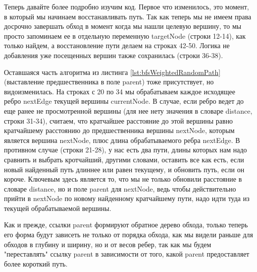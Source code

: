 \documentclass[../article.tex]{subfiles}
\begin{document}

Теперь давайте более подробно изучим код. Первое что изменилось, это момент, в который мы начинаем восстанавливать путь. Так как теперь мы не имеем права досрочно завершать обход в момент когда мы нашли целевую вершину, то мы просто запоминаем ее в отдельную переменную {\firacodebold targetNode} (строки 12-14), как только найдем, а восстановление пути делаем на строках 42-50. Логика не добавления уже посещенных вершин также сохранилась (строки 36-38).

Оставшаяся часть алгоритма из листинга \ref{lst:bfsWeightedRandomPath} (выставление предшественника в поле {\firacodebold parent}) тоже присутствует, но видоизменилась. На строках с 20 по 34 мы обрабатываем каждое исходящее ребро {\firacodebold nextEdge} текущей вершины {\firacodebold currentNode}. В случае, если ребро ведет до еще ранее не просмотренной вершины (для нее нету значения в словаре {\firacodebold distance}, строки 31-34), считаем, что кратчайшее расстояние до этой вершины равно кратчайшему расстоянию до предшественника вершины {\firacodebold nextNode}, которым является вершина {\firacodebold nextNode}, плюс длина обрабатываемого ребра {\firacodebold nextEdge}. В противном случае (строки 21-28), у нас есть два пути, длины которых нам надо сравнить и выбрать кротчайший, другими словами, оставить все как есть, если новый найденный путь длиннее или равен текущему, и обновить путь, если он короче. Ключевым здесь является то, что мы не только обновили расстояние в словаре {\firacodebold distance}, но и поле {\firacodebold parent} для {\firacodebold nextNode}, ведь чтобы действительно прийти в nextNode по новому найденному кратчайшему пути, надо идти туда из текущей обрабатываемой вершины.

Как и прежде, ссылки {\firacodebold parent} формируют обратное дерево обхода, только теперь его форма будут зависеть не только от порядка обхода, как мы видели раньше для обходов в глубину и ширину, но и от весов ребер, так как мы будем "переставлять" ссылку {\firacodebold parent} в зависимости от того, какой {\firacodebold parent} предоставляет более короткий путь.
\end{document}
